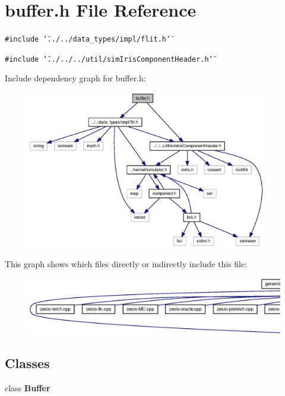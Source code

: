 \section{buffer.h File Reference}
\label{buffer_8h}
{\tt \#include \char`\"{}../../data\_\-types/impl/flit.h\char`\"{}}\par
{\tt \#include \char`\"{}../../../util/simIrisComponentHeader.h\char`\"{}}\par


Include dependency graph for buffer.h:\nopagebreak
\begin{figure}[H]
\begin{center}
\leavevmode
\includegraphics[width=297pt]{buffer_8h__incl}
\end{center}
\end{figure}


This graph shows which files directly or indirectly include this file:\nopagebreak
\begin{figure}[H]
\begin{center}
\leavevmode
\includegraphics[width=420pt]{buffer_8h__dep__incl}
\end{center}
\end{figure}
\subsection*{Classes}
\begin{CompactItemize}
\item 
class {\bf Buffer}
\end{CompactItemize}
